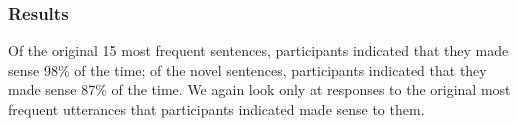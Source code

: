 \documentclass[preprint,12pt,authoryear,titlepage]{elsarticle}
\newcommand{\ndg}[1]{\textcolor{Green}{[ndg: #1]}}
\begin{document}
%
%
%
%

\subsubsection{Results}

Of the original 15 most frequent sentences, participants indicated that they made sense 98\% of the time; of the novel sentences, participants indicated that they made sense 87\% of the time.
We again look only at responses to the original most frequent utterances that participants indicated made sense to them.
\end{document}
